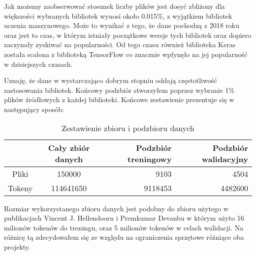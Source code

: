 Jak możemy zaobserwować stosunek liczby plików jest dosyć zbliżony dla większości wybranych bibliotek wynosi około 0.015\%, z wyjątkiem 
bibliotek uczenia maszynowego. Może to wynikać z tego, że dane pochodzą z 2018 roku oraz jest to czas, w którym istniały początkowe wersje tych bibliotek oraz dopiero
zaczynały zyskiwać na popularności. Od tego czasu również biblioteka Keras została scalona z biblioteką TensorFlow co znacznie wpłynęło na jej popularność w dzisiejszych czasach. 

Uznaję, że dane w wystarczająco dobrym stopniu oddają częstotliwość zastosowania bibliotek. Końcowy podzbiór stworzyłem poprzez wybranie 1\% plików źródłowych z każdej biblioteki. 
Końcowe zestawienie prezentuje się w następujący sposób:

\begin{table}[!h] \centering
    \caption{Zestawienie zbioru i podzbioru danych}
    \label{tab:dataset-compare-github}
    
    \begin{tabular} {| c | c | r | r |} \hline
         & Cały zbiór danych & Podzbiór treningowy & Podzbiór walidacyjny \\\hline\hline
        Pliki & 150000 & 9103 & 4504 \\\hline
        Tokeny & 114641650 & 9118453 & 4482600 \\ \hline
    \end{tabular}
\end{table}
Rozmiar wykorzystanego zbioru danych jest podobny do zbioru użytego w publikacjach Vincent J. Hellendoorn i Premkumar Devanbu \cite{hellendoorn} w którym użyto 16 milionów tokenów do treningu, oraz 
5 milionów tokenów w celach walidacji. Na różnicę tą zdecydowałem się ze względu na ograniczenia sprzętowe różniące oba projekty. 


